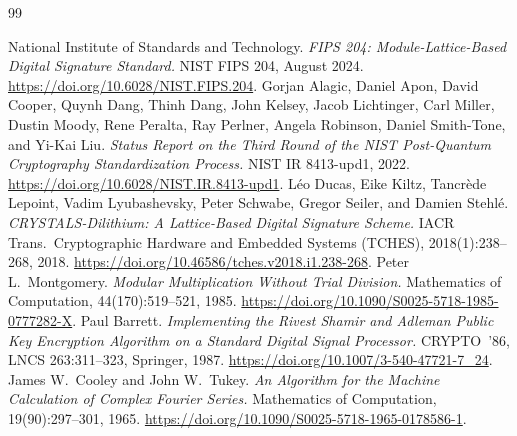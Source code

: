 \documentclass[11pt]{article}
\begin{document}
\begin{thebibliography}{99}

 National Institute of Standards and Technology.
  \emph{FIPS 204: Module-Lattice-Based Digital Signature Standard.} NIST FIPS 204, August 2024.
  \url{https://doi.org/10.6028/NIST.FIPS.204}.
 Gorjan Alagic, Daniel Apon, David Cooper, Quynh Dang, Thinh Dang, John Kelsey,
  Jacob Lichtinger, Carl Miller, Dustin Moody, Rene Peralta, Ray Perlner, Angela Robinson,
  Daniel Smith-Tone, and Yi-Kai Liu. \emph{Status Report on the Third Round of the NIST Post-Quantum
  Cryptography Standardization Process.} NIST IR 8413-upd1, 2022.
  \url{https://doi.org/10.6028/NIST.IR.8413-upd1}.
 L\'eo Ducas, Eike Kiltz, Tancr\`ede Lepoint, Vadim Lyubashevsky, Peter Schwabe,
  Gregor Seiler, and Damien Stehl\'e. \emph{CRYSTALS-Dilithium: A Lattice-Based Digital Signature
  Scheme.} IACR Trans.\ Cryptographic Hardware and Embedded Systems (TCHES), 2018(1):238--268, 2018.
  \url{https://doi.org/10.46586/tches.v2018.i1.238-268}.
 Peter L.\ Montgomery. \emph{Modular Multiplication Without Trial Division.}
  Mathematics of Computation, 44(170):519--521, 1985.
  \url{https://doi.org/10.1090/S0025-5718-1985-0777282-X}.
 Paul Barrett. \emph{Implementing the Rivest Shamir and Adleman Public Key
  Encryption Algorithm on a Standard Digital Signal Processor.} CRYPTO~'86, LNCS 263:311--323,
  Springer, 1987. \url{https://doi.org/10.1007/3-540-47721-7_24}.
 James W.\ Cooley and John W.\ Tukey. \emph{An Algorithm for the Machine
  Calculation of Complex Fourier Series.} Mathematics of Computation, 19(90):297--301, 1965.
  \url{https://doi.org/10.1090/S0025-5718-1965-0178586-1}.


\end{thebibliography}
\end{document}
